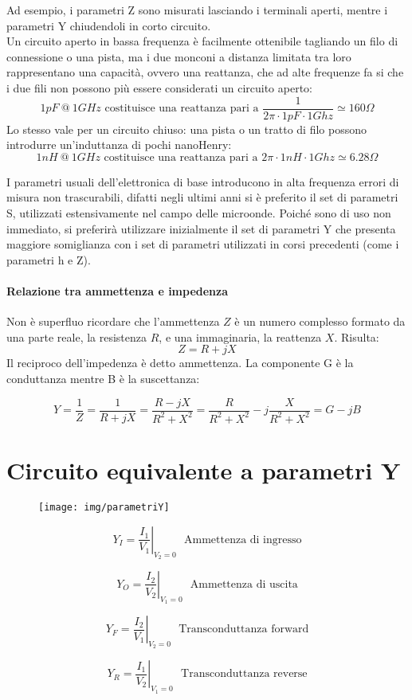 Ad esempio, i parametri Z sono misurati lasciando i terminali aperti, mentre i parametri Y chiudendoli in corto circuito.\\
Un circuito aperto in bassa frequenza è facilmente ottenibile tagliando un filo di connessione o una pista, ma i due monconi a distanza limitata tra loro rappresentano una capacità, ovvero una reattanza, che ad alte frequenze fa si che i due fili non possono più essere considerati un circuito aperto:
$$ 1pF ~ @ ~ 1GHz \mbox{ costituisce una reattanza pari a }
\frac{1}{2 \pi \cdot 1pF \cdot 1Ghz} \simeq 160 \Omega
$$
Lo stesso vale per un circuito chiuso: una pista o un tratto di filo possono introdurre un'induttanza di pochi nanoHenry:
$$ 1nH ~ @ ~ 1GHz \mbox{ costituisce una reattanza pari a }
2 \pi \cdot 1nH \cdot 1Ghz \simeq 6.28 \Omega
$$

I parametri usuali dell'elettronica di base introducono in alta frequenza errori di misura non trascurabili, difatti negli ultimi anni si è preferito il set di parametri S, utilizzati estensivamente nel campo delle microonde.
Poiché sono di uso non immediato, si preferirà utilizzare inizialmente il set di parametri Y che presenta maggiore somiglianza con i set di parametri utilizzati in corsi precedenti (come i parametri h e Z).

\paragraph{Relazione tra ammettenza e impedenza}
Non è superfluo ricordare che l'ammettenza $Z$ è un numero complesso formato da una parte reale, la resistenza $R$, e una immaginaria, la reattenza $X$. Risulta:
\[Z = R + jX\]
  Il reciproco dell'impedenza è detto ammettenza. La componente G è la conduttanza mentre B è la suscettanza:

\[Y = \frac{1}{Z} = \frac{1}{R+jX} = \frac{R-jX}{R^2+X^2} = \frac{R}{R^2 + X^2} -j \frac{X}{R^2 + X^2} = G - jB\]

\section{Circuito equivalente a parametri Y}

\begin{figure}[h!]
	\centering
	\texttt{[image: img/parametriY]}
	\caption{}
\end{figure}

\begin{multicols}{2}
	$$
	Y_I = \left. \frac{I_1}{V_1} \right|_{V_2=0}
	~~~
	\mbox{Ammettenza di ingresso}
	$$
	
	$$
	Y_O = \left. \frac{I_2}{V_2} \right|_{V_1=0}
	~~~
	\mbox{Ammettenza di uscita}
	$$
	
	$$
	Y_F = \left. \frac{I_2}{V_1} \right|_{V_2=0}
	~~~
	\mbox{Transconduttanza forward}
	$$
	
	$$
	Y_R = \left. \frac{I_1}{V_2} \right|_{V_1=0}
	~~~
	\mbox{Transconduttanza reverse}
	$$
\end{multicols}


